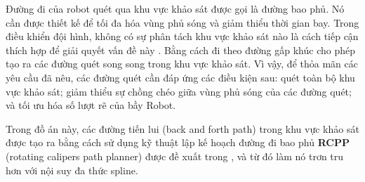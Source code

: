 Đường đi của robot quét qua khu vực khảo sát được gọi là đường bao phủ. Nó cần được thiết kế để tối đa hóa vùng phủ sóng và giảm thiểu thời gian bay. Trong điều khiển đội hình, không có sự phân tách khu vực khảo sát nào là cách tiếp cận thích hợp để giải quyết vấn đề này \cite{cabreira2019survey}. Bằng cách đi theo đường gấp khúc \cite{maza2007multiple} cho phép tạo ra các đường quét song song trong khu vực khảo sát. Vì vậy, để thỏa mãn các yêu cầu đã nêu, các đường quét cần đáp ứng các điều kiện sau: quét toàn bộ khu vực khảo sát; giảm thiểu sự chồng chéo giữa vùng phủ sóng của các đường quét; và tối ưu hóa số lượt rẽ của bầy Robot.

Trong đồ án này, các đường tiến lui (back and forth path) trong khu vực khảo sát được tạo ra bằng cách sử dụng kỹ thuật lập kế hoạch đường đi bao phủ \textbf{RCPP} (rotating calipers path planner) được đề xuất trong \cite{vasquez2020coverage}, và từ đó làm nó trơn tru hơn với nội suy đa thức spline.